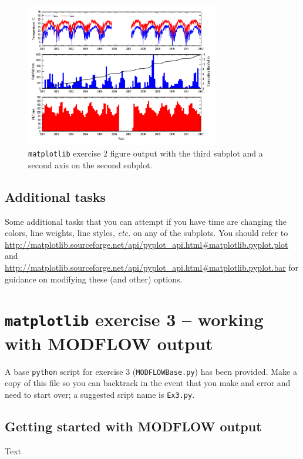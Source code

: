 \documentclass[12pt]{article}
\begin{document}
\begin{figure}[hp]
	\centering
  	\includegraphics[width=0.75\textwidth]{../figures/MeterologicBar.png}
 	\caption{\texttt{matplotlib} exercise 2 figure output with the third subplot and a second axis on the second subplot.}
	\label{FigEx2Step2}
\end{figure}

\subsection{Additional tasks}
Some additional tasks that you can attempt if you have time are changing the colors, line weights, line styles, \textit{etc.} on any of the subplots. You should refer to \url{http://matplotlib.sourceforge.net/api/pyplot_api.html\#matplotlib.pyplot.plot} and \url{http://matplotlib.sourceforge.net/api/pyplot_api.html\#matplotlib.pyplot.bar} for guidance on modifying these (and other) options.

\section{\texttt{matplotlib} exercise 3 -- working with MODFLOW output}
A base \texttt{python} script for exercise 3 (\texttt{MODFLOWBase.py}) has been provided. Make a copy of this file so you can backtrack in the event that you make and error and need to start over; a suggested sript name is \texttt{Ex3.py}.

\subsection{Getting started with MODFLOW output}
Text
\end{document}
